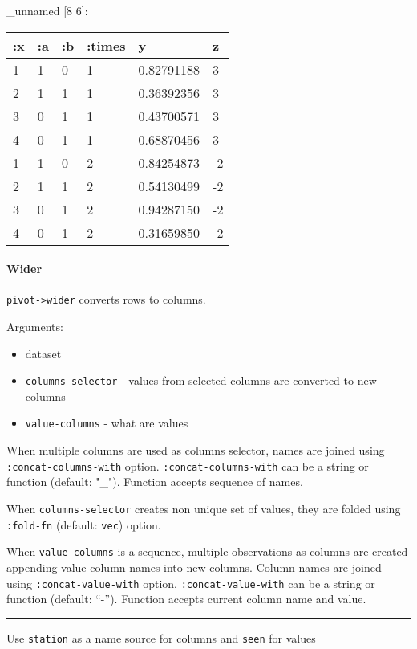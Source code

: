 \documentclass[]{article}
\providecommand{\tightlist}{%
  \setlength{\itemsep}{0pt}\setlength{\parskip}{0pt}}
\let\oldparagraph\paragraph
\renewcommand{\paragraph}[1]{\oldparagraph{#1}\mbox{}}
\begin{document}
\_unnamed {[}8 6{]}:

\begin{longtable}[]{@{}llllll@{}}
\toprule
:x & :a & :b & :times & y & z\tabularnewline
\midrule
\endhead
1 & 1 & 0 & 1 & 0.82791188 & 3\tabularnewline
2 & 1 & 1 & 1 & 0.36392356 & 3\tabularnewline
3 & 0 & 1 & 1 & 0.43700571 & 3\tabularnewline
4 & 0 & 1 & 1 & 0.68870456 & 3\tabularnewline
1 & 1 & 0 & 2 & 0.84254873 & -2\tabularnewline
2 & 1 & 1 & 2 & 0.54130499 & -2\tabularnewline
3 & 0 & 1 & 2 & 0.94287150 & -2\tabularnewline
4 & 0 & 1 & 2 & 0.31659850 & -2\tabularnewline
\bottomrule
\end{longtable}

\hypertarget{wider}{%
\paragraph{Wider}\label{wider}}

\texttt{pivot-\textgreater{}wider} converts rows to columns.

Arguments:

\begin{itemize}
\tightlist
\item
  dataset
\item
  \texttt{columns-selector} - values from selected columns are converted
  to new columns
\item
  \texttt{value-columns} - what are values
\end{itemize}

When multiple columns are used as columns selector, names are joined
using \texttt{:concat-columns-with} option.
\texttt{:concat-columns-with} can be a string or function (default:
"\_"). Function accepts sequence of names.

When \texttt{columns-selector} creates non unique set of values, they
are folded using \texttt{:fold-fn} (default: \texttt{vec}) option.

When \texttt{value-columns} is a sequence, multiple observations as
columns are created appending value column names into new columns.
Column names are joined using \texttt{:concat-value-with} option.
\texttt{:concat-value-with} can be a string or function (default:
``-''). Function accepts current column name and value.

\begin{center}\rule{0.5\linewidth}{0.5pt}\end{center}

Use \texttt{station} as a name source for columns and \texttt{seen} for
values
\end{document}
